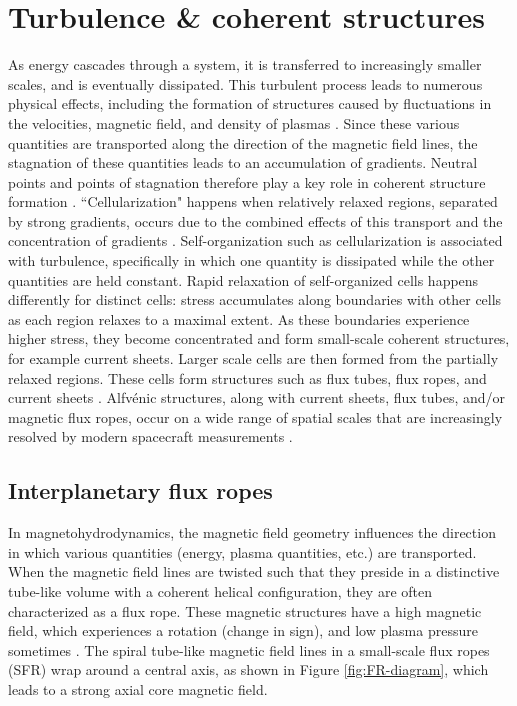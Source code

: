 \section{Turbulence \& coherent structures}
As energy cascades through a system, it is transferred to increasingly smaller scales, and is eventually dissipated. This turbulent process leads to numerous physical effects, including the formation of structures caused by fluctuations in the velocities, magnetic field, and density of plasmas \citep{Matthaeus:2015}. Since these various quantities are transported along the direction of the magnetic field lines, the stagnation of these quantities leads to an accumulation of gradients. Neutral points and points of stagnation therefore play a key role in coherent structure formation \citep{Matthaeus:2015}. ``Cellularization" happens when relatively relaxed regions, separated by strong gradients, occurs due to the combined effects of this transport and the concentration of gradients \citep{Matthaeus:2015}. Self-organization such as cellularization is associated with turbulence, specifically in which one quantity is dissipated while the other quantities are held constant. Rapid relaxation of self-organized cells happens differently for distinct cells: stress accumulates along boundaries with other cells as each region relaxes to a maximal extent. As these boundaries experience higher stress, they become concentrated and form small-scale coherent structures, for example current sheets. Larger scale cells are then formed from the partially relaxed regions. These cells form structures such as flux tubes, flux ropes, and current sheets \citep{Matthaeus:2015}. Alfv\'enic structures, along with current sheets, flux tubes, and/or magnetic flux ropes, occur on a wide range of spatial scales that are increasingly resolved by modern spacecraft measurements \citep{Greco:2018, Pecora:2019, Zheng:2018, Artemyev:2019}.



\subsection{Interplanetary flux ropes}
In magnetohydrodynamics, the magnetic field geometry influences the direction in which various quantities (energy, plasma quantities, etc.) are transported. When the magnetic field lines are twisted such that they preside in a distinctive tube-like volume with a coherent helical configuration, they are often characterized as a flux rope. These magnetic structures have a high magnetic field, which experiences a rotation (change in sign), and low plasma pressure sometimes \citep{Cartwright:2008}. The spiral tube-like magnetic field lines in a small-scale flux ropes (\gls{SFR}) wrap around a central axis, as shown in Figure \ref{fig:FR-diagram}, which leads to a strong axial core magnetic field.

